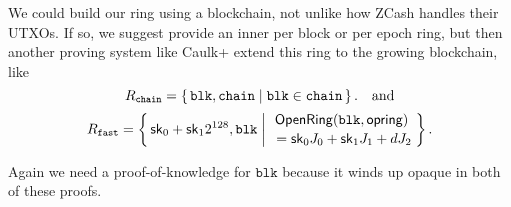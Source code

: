 \def\comblock{\ensuremath{\mathsf{comblock}}\xspace}
\newcommand\pichain{\ensuremath{\pi_{\mathtt{chain}}}\xspace}

We could build our ring using a blockchain,
 not unlike how ZCash handles their UTXOs.
If so, we suggest \pifast provide an inner per block or per epoch ring,
but then another proving system like Caulk+ \cite{caulk+}
 extend this ring to the growing blockchain, like
%
$$ \baseR_{\mathtt{chain}} = \Setst{ \mathtt{blk}, \mathtt{chain} }{
	\mathtt{blk} \in \mathtt{chain}
} \mathcomma \quad\textrm{and} $$ 
%
$$ \Rfast = \Setst{ \sk_0 + \sk_1 2^{128}, \mathtt{blk} }{
	\eprint{\exists d,\openring \textrm{\ s.t.\ }}{}
	\genfrac{}{}{0pt}{}{ \OpenRing(\mathtt{blk},\openring) }{ \,\, = \sk_0 \genJ_0 + \sk_1 \genJ_1 + d \genJ_2 }
} \mathperiod $$  

Again we need a proof-of-knowledge for $\mathtt{blk}$ because it winds up opaque
 in both of these proofs. 



\endinput

